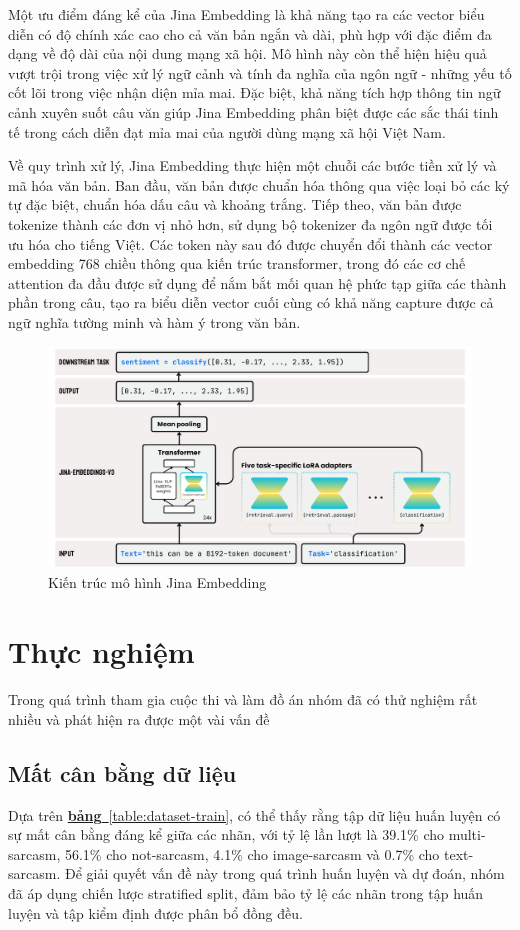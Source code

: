 \documentclass[11pt]{article}
\begin{document}
Một ưu điểm đáng kể của Jina Embedding là khả năng tạo ra các vector biểu diễn có độ chính xác cao cho cả văn bản ngắn và dài, phù hợp với đặc điểm đa dạng về độ dài của nội dung mạng xã hội. Mô hình này còn thể hiện hiệu quả vượt trội trong việc xử lý ngữ cảnh và tính đa nghĩa của ngôn ngữ - những yếu tố cốt lõi trong việc nhận diện mỉa mai. Đặc biệt, khả năng tích hợp thông tin ngữ cảnh xuyên suốt câu văn giúp Jina Embedding phân biệt được các sắc thái tinh tế trong cách diễn đạt mỉa mai của người dùng mạng xã hội Việt Nam.

Về quy trình xử lý, Jina Embedding thực hiện một chuỗi các bước tiền xử lý và mã hóa văn bản. Ban đầu, văn bản được chuẩn hóa thông qua việc loại bỏ các ký tự đặc biệt, chuẩn hóa dấu câu và khoảng trắng. Tiếp theo, văn bản được tokenize thành các đơn vị nhỏ hơn, sử dụng bộ tokenizer đa ngôn ngữ được tối ưu hóa cho tiếng Việt. Các token này sau đó được chuyển đổi thành các vector embedding 768 chiều thông qua kiến trúc transformer, trong đó các cơ chế attention đa đầu được sử dụng để nắm bắt mối quan hệ phức tạp giữa các thành phần trong câu, tạo ra biểu diễn vector cuối cùng có khả năng capture được cả ngữ nghĩa tường minh và hàm ý trong văn bản.
\begin{figure}[h!]
\centering
\includegraphics[width=1.0\linewidth]{jina_figure.png}
\caption{Kiến trúc mô hình Jina Embedding}
\end{figure}
\vspace*{-5mm}
\section{Thực nghiệm}
\hspace*{5mm}Trong quá trình tham gia cuộc thi và làm đồ án nhóm đã có thử nghiệm rất nhiều và phát hiện ra được một vài vấn đề 
\subsection{Mất cân bằng dữ liệu}
\hspace*{5mm}Dựa trên \hyperref[table:dataset-train]{\textbf{bảng}~\ref*{table:dataset-train}}, có thể thấy rằng tập dữ liệu huấn luyện có sự mất cân bằng đáng kể giữa các nhãn, với tỷ lệ lần lượt là 39.1\% cho multi-sarcasm, 56.1\% cho not-sarcasm, 4.1\% cho image-sarcasm và 0.7\% cho text-sarcasm. Để giải quyết vấn đề này trong quá trình huấn luyện và dự đoán, nhóm đã áp dụng chiến lược stratified split, đảm bảo tỷ lệ các nhãn trong tập huấn luyện và tập kiểm định được phân bổ đồng đều.
\end{document}
